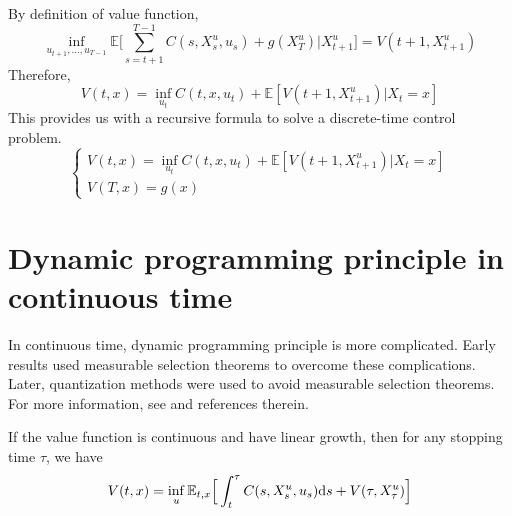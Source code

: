 \documentclass[11pt]{book}
\newcommand{\ds}{\text{\normalfont d}s}
\begin{document}
By definition of value function, 
\begin{equation}
    \inf_{u_{t+1},...,u_{T-1}} \mathbb{E}\Big[\sum_{s=t+1}^{T-1} C(s,X^u_s,u_s)+g(X^u_T)\Big|X^u_{t+1}\Big]=V(t+1,X^u_{t+1})
\end{equation}
Therefore,
\begin{equation}\label{one-step_DPP}
    V(t,x)= \inf_{u_t}
    C(t,x,u_t) + \mathbb{E}[V(t+1,X^u_{t+1})|X_t=x]
\end{equation}
This provides us with a recursive formula to solve a discrete-time control problem.
\begin{equation}\label{eqn:dpp_discrete}
    \begin{cases}
        V(t,x)= \inf_{u_t}
    C(t,x,u_t) + \mathbb{E}[V(t+1,X^u_{t+1})|X_t=x]\\
    V(T,x)=g(x)
    \end{cases}
\end{equation}



\section{Dynamic programming principle in continuous time}
In continuous time, dynamic programming principle is more complicated. Early results used measurable selection theorems to overcome these complications. Later, quantization methods were used to avoid measurable selection theorems. For more information, see \cite{Touzi12} and references therein.
\begin{thm}\label{thm:dpp}
    If the value function is continuous and have linear growth, then for any stopping time $\tau$, we have 
    \begin{equation}\label{eqn:dpp}
        V(t,x)=\inf_{u}\mathbb{E}_{t,x}\Big[\int_t^\tau C(s,X^u_s,u_s){{\ds}} + V(\tau,X_\tau^u)\Big]
    \end{equation}
\end{thm}
\end{document}
